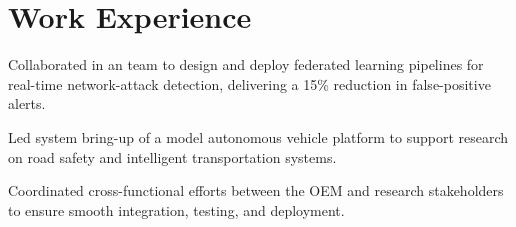 \documentclass[]{resume-template}
\begin{document}
\begin{minipage}[t]{0.66\textwidth}

  \section{Work Experience}\label{sec:Work Experience}
  \label{subsec:protectionshield}
  \vspace{\topsep}
  \begin{tightemize}
  \item Collaborated in an team to design and deploy federated learning pipelines for real-time network-attack detection, delivering a 15\% reduction in false-positive alerts.
  \end{tightemize}
  \begin{tightemize}
  \item Led system bring-up
    of a model autonomous vehicle platform to support research on road safety
    and intelligent transportation systems.
  \item Coordinated cross-functional efforts between the OEM and research
    stakeholders to ensure smooth integration, testing, and deployment.
  \end{tightemize}


\end{minipage}
\end{document}
